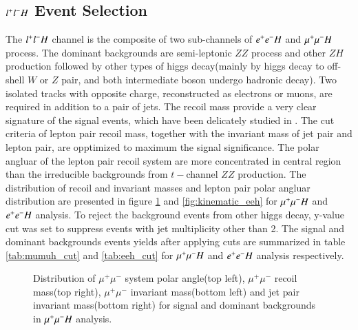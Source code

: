 \subsection{$l^{+}l^{-}H$ Event Selection}
The $l^{+}l^{-}H$ channel is the composite of two sub-channels of $e^{+}e^{-}H$ and $\mu^{+}\mu^{-}H$ process. The dominant backgrounds are semi-leptonic $ZZ$ process and other $ZH$ production followed by other types of higgs decay(mainly by higgs decay to off-shell $W$ or $Z$ pair, and both intermediate boson undergo hadronic decay).
Two isolated tracks with opposite charge, reconstructed as electrons or muons, are required in addition to a pair of jets.  The recoil mass provide a very clear signature of the signal events, which have been delicately studied in \cite{CEPC:recoilmass}. 
The cut criteria of lepton pair recoil mass, together with the invariant mass of jet pair and lepton pair, are opptimized to maximum the signal significance. 
The polar angluar of the lepton pair recoil system are more concentrated in central region than the irreducible backgrounds from $t-$channel $ZZ$ production. The distribution of recoil and invariant masses and lepton pair
polar angluar distribution are presented in figure \ref{fig:kinematic_mumuh} and 
\ref{fig:kinematic_eeh} for $\mu^{+}\mu^{-}H$ and $e^{+}e^{-}H$ analysis.
To reject the background events from other higgs decay, y-value cut was set to suppress events with jet multiplicity other than 2. The signal and dominant backgrounds events yields after applying cuts are summarized in table \ref{tab:mumuh_cut} and \ref{tab:eeh_cut} for $\mu^{+}\mu^{-}H$ and $e^{+}e^{-}H$ analysis respectively.\par


\begin{figure}[!htpb]
\label{fig:kinematic_mumuh}
\centering
{}
\caption{Distribution of $\mu^+\mu^-$ system polar angle(top left), $\mu^+\mu^-$ recoil mass(top right), $\mu^+\mu^-$ invariant mass(bottom left) and jet pair invariant mass(bottom right) for signal and dominant backgrounds in $\mu^{+}\mu^{-}H$ analysis.}
\end{figure}

